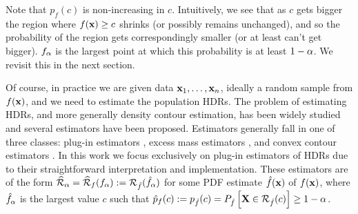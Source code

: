 Note that $p_{f}(c)$ is non-increasing in $c$.
Intuitively, we see that as $c$ gets bigger the region where $f(\textbf{x}) \geq c$ shrinks
(or possibly remains unchanged),
and so the probability of the region gets correspondingly smaller (or at least can't get bigger).
$f_{\alpha}$ is the largest point at which this probability is at least $1 - \alpha$.
We revisit this in the next section.

Of course, in practice we are given data $\textbf{x}_{1}, \ldots, \textbf{x}_{n}$, ideally a random sample from $f(\textbf{x})$, and we need to estimate the population HDRs.
The problem of estimating HDRs, and more generally density contour estimation, has been widely studied and several estimators have been proposed.
Estimators generally fall in one of three classes: plug-in estimators \citep{rigollet_optimal_2009, cadre_kernel_2006}, excess mass estimators \citep{muller_excess_1991, polonik_measuring_1995}, and convex contour estimators \citep{hartigan_estimation_1987}.
In this work we focus exclusively on plug-in estimators of HDRs
due to their straightforward interpretation and implementation.
These estimators are of the form $\widehat{\mathcal{R}}_{\alpha} = \widehat{\mathcal{R}}_{f}(f_{\alpha}) := \mathcal{R}_{\hat{f}}(\hat{f}_{\alpha})$ for some PDF estimate $\hat{f}(\textbf{x})$ of $f(\textbf{x})$, where $\hat{f}_{\alpha}$ is the largest value $c$ such that $\hat{p}_{f}(c) := p_{\hat{f}}(c) = P_{\hat{f}}\left[\textbf{X} \in \mathcal{R}_{\hat{f}}(c)\right] \geq 1 - \alpha$.




